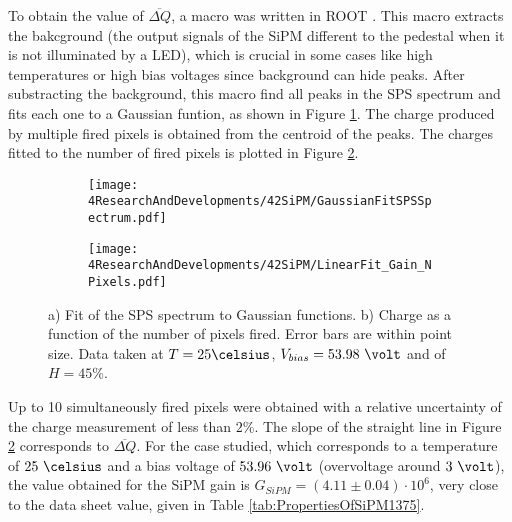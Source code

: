 To obtain the value of $\overline{\Delta Q}$, a macro was written in ROOT \cite{ROOTWebPage}. This macro extracts the bakcground (the output signals of the SiPM different to the pedestal when it is not illuminated by a LED), which is crucial in some cases like high temperatures or high bias voltages since background can hide peaks. After substracting the background, this macro find all peaks in the SPS spectrum and fits each one to a Gaussian funtion, as shown in Figure \ref{subfig:GaussianFitSiPMs}. The charge produced by multiple fired pixels is obtained from the centroid of the peaks. The charges fitted to the number of fired pixels is plotted in Figure \ref{subfig:LinearFitSiPMGain}.
\begin{figure}
\centering
    \begin{subfigure}[b]{0.9\textwidth}
    \centering
    \texttt{[image: 4ResearchAndDevelopments/42SiPM/GaussianFitSPSSpectrum.pdf]}  
    \caption{\label{subfig:GaussianFitSiPMs}}
    \end{subfigure}
    \hfill
    \begin{subfigure}[b]{0.9\textwidth}
    \centering
    \texttt{[image: 4ResearchAndDevelopments/42SiPM/LinearFit\_Gain\_NPixels.pdf]}  
    \caption{\label{subfig:LinearFitSiPMGain}}
    \end{subfigure}
 \caption{a) Fit of the SPS spectrum to Gaussian functions. b) Charge as a function of the number of pixels fired. Error bars are within point size. Data taken at $T=25\celsius$, $V_{bias}=53.98~\volt$ and of $H=45\%$.}
 \label{fig:ROOTAnalysisSiPMGain}
\end{figure}
Up to 10 simultaneously fired pixels were obtained with a relative uncertainty of the charge measurement of less than $2\%$. The slope of the straight line in Figure \ref{subfig:LinearFitSiPMGain} corresponds to $\overline{\Delta Q}$.
For the case studied, which corresponds to a temperature of $25~\celsius$ and a bias voltage of $53.96~\volt$ (overvoltage around $3~\volt$), the value obtained for the SiPM gain is $G_{SiPM}=(4.11 \pm 0.04) \cdot{} 10^{6}$, very close to the data sheet value, given in Table \ref{tab:PropertiesOfSiPM1375}.

